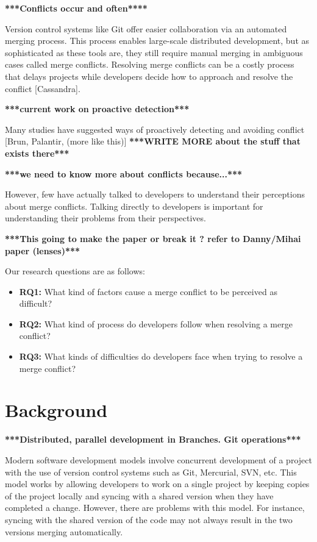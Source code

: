 \documentclass[conference]{IEEEtran}
\begin{document}
\textbf{***Conflicts occur and often****}

Version control systems like Git offer easier collaboration via an automated merging process. This process enables large-scale distributed development, but as sophisticated as these tools are, they still require manual merging in ambiguous cases called merge conflicts. Resolving merge conflicts can be a costly process that delays projects while developers decide how to approach and resolve the conflict [Cassandra]. 

\textbf{***current work on proactive detection***}

Many studies have suggested ways of proactively detecting and avoiding conflict [Brun, Palantir, (more like this)] \textbf{***WRITE MORE about the stuff that exists there***}

\textbf{***we need to know more about conflicts because...***}

However, few have actually talked to developers to understand their perceptions about merge conflicts. Talking directly to developers is important for understanding their problems from their perspectives. 

\textbf{***This going to make the paper or break it ? refer to Danny/Mihai paper (lenses)***}

Our research questions are as follows:
\begin{itemize}
\item\textbf{RQ1:} What kind of factors cause a merge conflict to be perceived as difficult?\\
\item\textbf{RQ2:} What kind of process do developers follow when resolving a merge conflict?\\
\item\textbf{RQ3:} What kinds of difficulties do developers face when trying to resolve a merge conflict?\\
\end{itemize}

\section{Background}

\textbf{***Distributed, parallel development in Branches. Git operations***}

Modern software development models involve concurrent development of a project with the use of version control systems such as Git, Mercurial, SVN, etc. This model works by allowing developers to work on a single project by keeping copies of the project locally and syncing with a shared version when they have completed a change. However, there are problems with this model. For instance, syncing with the shared version of the code may not always result in the two versions merging automatically.
\end{document}
